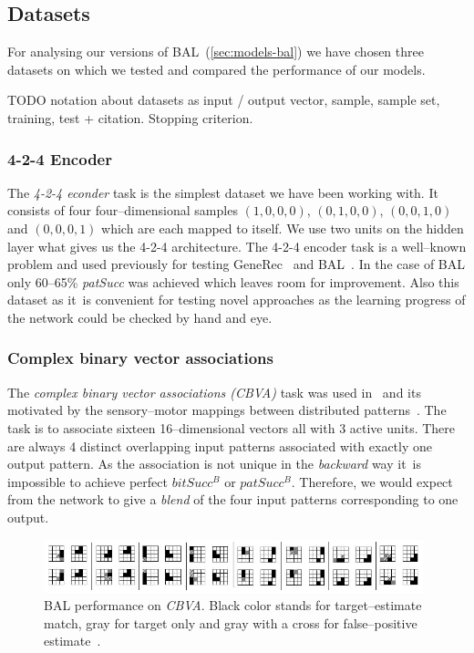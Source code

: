 
\subsection{Datasets}  
\label{sec:sim-data} 

For analysing our versions of BAL~(\ref{sec:models-bal}) we have chosen three datasets on which we tested and compared the performance of our models. 

TODO notation about datasets as input / output vector, sample, sample set, training, test + citation. Stopping criterion. 

\subsubsection{4-2-4 Encoder} 
\label{sec:datasets-auto4}


The \emph{4-2-4 econder} task is the simplest dataset we have been working with. It consists of four four--dimensional samples $(1,0,0,0)$, $(0,1,0,0)$, $(0,0,1,0)$ and $(0,0,0,1)$ which are each mapped to itself. We use two units on the hidden layer what gives us the 4-2-4 architecture. The 4-2-4 encoder task is a well--known problem and used previously for testing GeneRec~\citep{o1996bio} and BAL~\citep{farkas2013bal}. In the case of BAL only 60--65\% \emph{patSucc} was achieved which leaves room for improvement. Also this dataset as it~is convenient for testing novel approaches as the learning progress of the network could be checked by hand and eye. 

\subsubsection{Complex binary vector associations} 
\label{sec:datasets-k3}

The \emph{complex binary vector associations (CBVA)} task was used in~\citet{farkas2013bal} and its motivated by the sensory--motor mappings between distributed patterns~\citep{farkas2013bal}. The task is to associate sixteen 16--dimensional vectors all with 3 active units. There are always 4 distinct overlapping input patterns associated with exactly one output pattern. As the association is not unique in the \emph{backward} way it~is impossible to achieve perfect $bitSucc^B$ or $patSucc^B$. Therefore, we would expect from the network to give a \emph{blend} of the four input patterns corresponding to one output. 

\begin{figure}[H]
  \centering
  \includegraphics[width=0.98\textwidth]{img/datasets-k3.png} 
  \caption{BAL performance on \emph{CBVA}. Black color stands for target--estimate match, gray for target only and gray with a cross for false--positive estimate~\citep{farkas2013bal}.}
  \label{fig:datasets-k3}
\end{figure}

